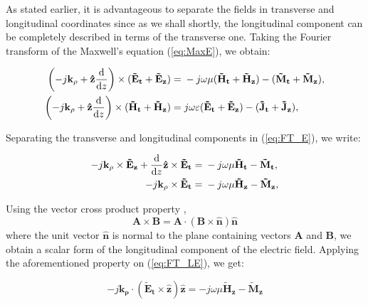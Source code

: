 \documentclass[11pt]{article}
\newcommand{\v}[1]{\mathbf{#1}} %
\newcommand{\t}[1]{\tilde{#1}} %
\renewcommand{\w}{\omega}  %
\renewcommand{\e}{\varepsilon}  %
\renewcommand{\u}{\mu}  %
\renewcommand{\p}{\rho}  %
\begin{document}
  As stated earlier, it is advantageous to separate the fields in transverse and longitudinal coordinates since as we shall shortly, the longitudinal component can be completely described in terms of the transverse one. Taking the Fourier transform of the Maxwell's equation (\ref{eq:MaxE}), we obtain:

  \begin{subequations}
    \begin{align}
      \left(-j\v{k_{\p}} + \v{\hat{z}} \dv{}{z} \right)\times (\v{\t{E}_t} + \v{\t{E}_z})  ={}& -j \w \u (\v{\t{H}_t} + \v{\t{H}_z}) -
      (\v{\t{M}_t} + \v{\t{M}_z}),
      \label{eq:FT_E}\\
      \left(-j\v{k_{\p}} + \v{\hat{z}} \dv{}{z} \right)\times (\v{\t{H}_t} + \v{\t{H}_z})  ={}& j \w \e (\v{\t{E}_t} + \v{\t{E}_z}) -
      (\v{\t{J}_t} + \v{\t{J}_z}),
      \label{eq:FT_H}
    \end{align}
    \label{eq:FT_MaxE}
  \end{subequations}

  Separating the transverse and longitudinal components in (\ref{eq:FT_E}), we write:

  \begin{subequations}
    \begin{align}
      -j\v{k_{\p}} \times \v{\t{E}_z} +
      \dv{}{z}\v{\hat{z}} \times \v{\t{E}_t} ={}&
      -j \w \u \v{\t{H}_t} -
      \v{\t{M}_t},
      \label{eq:FT_TE}\\
      -j\v{k_{\p}} \times \v{\t{E}_t} ={}&
      -j \w \u \v{\t{H}_z} -
      \v{\t{M}_z},
      \label{eq:FT_LE}
    \end{align}
    \label{eq:FT_TLE}
  \end{subequations}

  Using the vector cross product property \cite[p. 117]{fang2009antenna},
  \begin{equation}
    \v{A}\times\v{B} =\v{A}\cdot (\v{B} \times \v{\hat{n}})\v{\hat{n}}
    \label{eq:vec}
  \end{equation}
  where the unit vector $\v{\hat{n}}$ is normal to the plane containing vectors $\v{A}$ and $\v{B}$, we obtain a scalar form of the longitudinal component of the electric field. Applying the aforementioned property on (\ref{eq:FT_LE}), we get:

  \begin{equation}
    -j \v{k_{\p}} \cdot (\v{\t{E}_t} \times \v{\hat{z}})\v{\hat{z}} =
    -j \w \u \v{\t{H}_z} - \v{\t{M}_z}
    \label{eq:FT_sLE}
  \end{equation}
\end{document}
